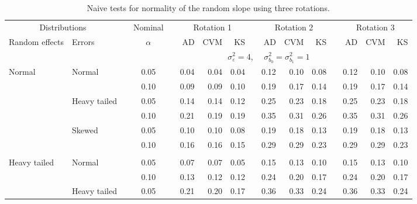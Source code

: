 \documentclass[11pt]{article} %
\begin{document}
\begin{table}[ht]
\begin{scriptsize}
\begin{center}
\begin{tabular}{ll p{.1cm} c p{.1cm} rrr p{.1cm} rrr p{.1cm} rrr}
   \hline
\end{tabular}
\end{center}
\end{scriptsize}
\end{table}



\begin{table}[ht]
\caption{Naive tests for normality of the random slope using three rotations.}
\begin{scriptsize}
\begin{center}
\begin{tabular}{ll p{.1cm} c p{.1cm} rrr p{.1cm} rrr p{.1cm} rrr}
  \hline
  \multicolumn{2}{c}{Distributions}& & Nominal & &  \multicolumn{3}{c}{Rotation 1} & & \multicolumn{3}{c}{Rotation 2} & & \multicolumn{3}{c}{Rotation 3}\\ \cline{1-2} \cline{6-8} \cline{10-12} \cline{14-16}
  Random effects & Errors & & $\alpha$ & & AD & CVM & KS & & AD & CVM & KS & & AD & CVM & KS \\ 
   \hline
& && && \multicolumn{9}{c}{$\sigma_{\varepsilon}^2 = 4$, \ \ $\sigma_{b_0}^2 = \sigma_{b_1}^2 = 1$} \\ \cline{6-16}
Normal       & Normal       && 0.05 &&   0.04 & 0.04 & 0.04 && 0.12 & 0.10 & 0.08 && 0.12 & 0.10 & 0.08 \\ 
             &              && 0.10 &&   0.09 & 0.09 & 0.10 && 0.19 & 0.17 & 0.14 && 0.19 & 0.17 & 0.14 \\ 
             & Heavy tailed && 0.05 &&   0.14 & 0.14 & 0.12 && 0.25 & 0.23 & 0.18 && 0.25 & 0.23 & 0.18 \\ 
             &              && 0.10 &&   0.21 & 0.19 & 0.19 && 0.35 & 0.31 & 0.26 && 0.35 & 0.31 & 0.26 \\ 
             & Skewed       && 0.05 &&   0.10 & 0.10 & 0.08 && 0.19 & 0.18 & 0.13 && 0.19 & 0.18 & 0.13 \\ 
             &              && 0.10 &&   0.16 & 0.16 & 0.15 && 0.29 & 0.29 & 0.23 && 0.29 & 0.29 & 0.23 \\ 
             &&&&&&&&&&&&&&&\\
Heavy tailed & Normal       && 0.05 &&   0.07 & 0.07 & 0.05 && 0.15 & 0.13 & 0.10 && 0.15 & 0.13 & 0.10 \\ 
             &              && 0.10 &&   0.13 & 0.12 & 0.12 && 0.24 & 0.20 & 0.17 && 0.24 & 0.20 & 0.17 \\ 
             & Heavy tailed && 0.05 &&   0.21 & 0.20 & 0.17 && 0.36 & 0.33 & 0.24 && 0.36 & 0.33 & 0.24 \\ 

\end{tabular}
\end{center}
\end{scriptsize}
\end{table}
\end{document}

